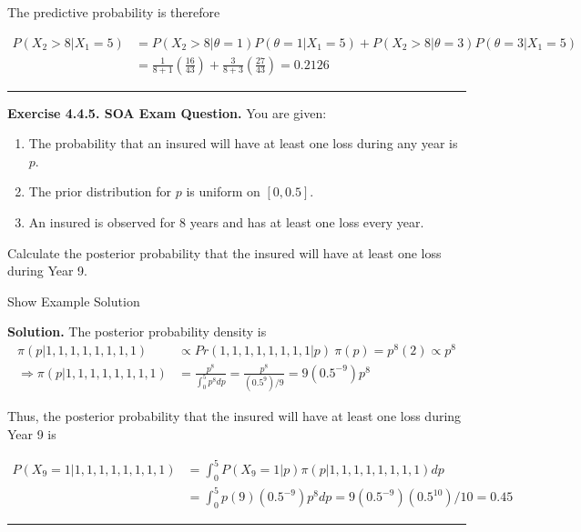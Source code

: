 \documentclass[]{book}
\providecommand{\tightlist}{%
  \setlength{\itemsep}{0pt}\setlength{\parskip}{0pt}}
\theoremstyle{definition}
\theoremstyle{definition}
\theoremstyle{definition}
\theoremstyle{remark}
\begin{document}
The predictive probability is therefore

\[\begin{aligned}
P(X_2>8|X_1=5) &= P(X_2>8|\theta=1) P(\theta=1|X_1=5) + P(X_2>8|\theta=3) P(\theta=3 | X_1=5) \\
&= \frac{1}{8+1}\left( \frac{16}{43}\right) + \frac{3}{8+3} \left( \frac{27}{43}\right) = 0.2126
\end{aligned}\]

\begin{center}\rule{0.5\linewidth}{\linethickness}\end{center}

\textbf{Exercise 4.4.5. SOA Exam Question.} You are given:

\begin{enumerate}
\def\labelenumi{(\roman{enumi})}
\tightlist
\item
  The probability that an insured will have at least one loss during any
  year is \(p\).
\item
  The prior distribution for \(p\) is uniform on \([0, 0.5]\).
\item
  An insured is observed for 8 years and has at least one loss every
  year.
\end{enumerate}

Calculate the posterior probability that the insured will have at least
one loss during Year 9.

Show Example Solution

\hypertarget{toggleExampleSelect.4.5}{}
\textbf{Solution.} The posterior probability density is
\[\begin{aligned}
\pi(p|1,1,1,1,1,1,1,1) &\propto Pr(1,1,1,1,1,1,1,1|p)\ \pi(p) = p^8(2) \propto p^8 \\ 
\Rightarrow \pi(p|1,1,1,1,1,1,1,1) &= \frac{p^8}{\int_0^5 p^8 dp} = \frac{p^8}{(0.5^9)/9} = 9(0.5^{-9})p^8
\end{aligned}\]

Thus, the posterior probability that the insured will have at least one
loss during Year 9 is

\[\begin{aligned}
P(X_9=1|1,1,1,1,1,1,1,1) &= \int_0^5 P(X_9=1|p) \pi(p|1,1,1,1,1,1,1,1) dp \\
&= \int_0^5 p(9)(0.5^{-9})p^8 dp = 9(0.5^{-9})(0.5^{10})/10 = 0.45
\end{aligned}\]

\begin{center}\rule{0.5\linewidth}{\linethickness}\end{center}
\end{document}
